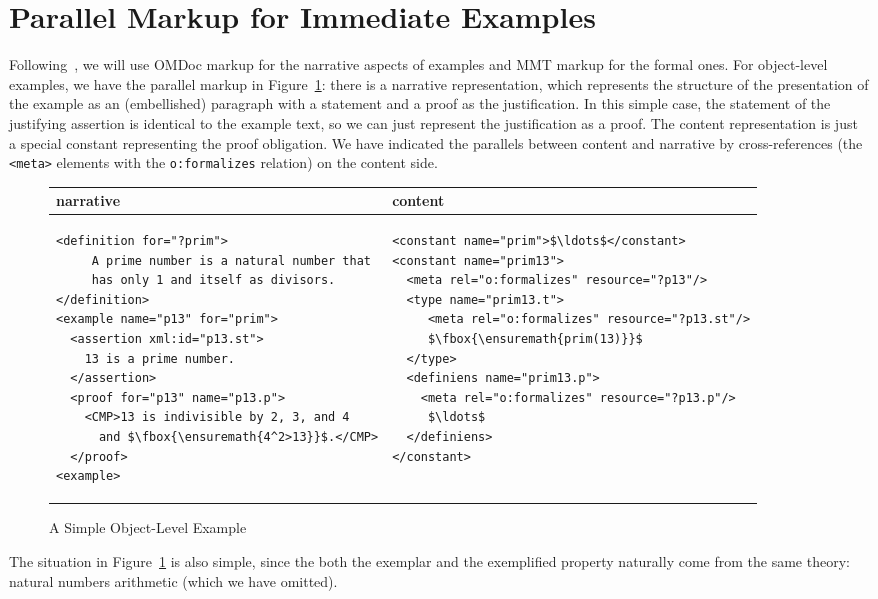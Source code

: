 \documentclass[11pt]{bluenote}
\def\mmt{MMT\xspace}
\def\omdoc{OMDoc\xspace}
\def\om#1{\fbox{\ensuremath{#1}}}
\def\omdoc{OMDoc\xspace}
\begin{document}
\section{Parallel Markup for Immediate Examples}\label{sec:immediate}

Following~\cite{KohIan:hlpmo13}, we will use \omdoc markup for the narrative aspects of
examples and \mmt markup for the formal ones. For object-level examples, we have the
parallel markup in Figure~\ref{fig:simple-object}: there is a narrative representation,
which represents the structure of the presentation of the example as an (embellished)
paragraph with a statement and a proof as the justification. In this simple case, the
statement of the justifying assertion is identical to the example text, so we can just
represent the justification as a proof. The content representation is just a special
constant representing the proof obligation. We have indicated the parallels between
content and narrative by cross-references (the \lstinline|<meta>| elements with the
\lstinline|o:formalizes| relation) on the content side.

\begin{figure}[ht]\centering
\lstset{mathescape}
\begin{tabular}{|p{7.1cm}|p{7.5cm}|}\hline
  narrative & content\\\hline
\begin{lstlisting}
<definition for="?prim">
     A prime number is a natural number that 
     has only 1 and itself as divisors.
</definition>
<example name="p13" for="prim">
  <assertion xml:id="p13.st">
    13 is a prime number.
  </assertion>
  <proof for="p13" name="p13.p">
    <CMP>13 is indivisible by 2, 3, and 4
      and $\om{4^2>13}$.</CMP>
  </proof>
<example>
\end{lstlisting}
&
\begin{lstlisting}
<constant name="prim">$\ldots$</constant>
<constant name="prim13">
  <meta rel="o:formalizes" resource="?p13"/>
  <type name="prim13.t">
     <meta rel="o:formalizes" resource="?p13.st"/>
     $\om{prim(13)}$
  </type>
  <definiens name="prim13.p">
    <meta rel="o:formalizes" resource="?p13.p"/>
     $\ldots$
  </definiens>
</constant>
\end{lstlisting}\\\hline
\end{tabular}
\caption{A Simple Object-Level Example}\label{fig:simple-object}
\end{figure}

The situation in Figure~\ref{fig:simple-object} is also simple, since the both the
exemplar and the exemplified property naturally come from the same theory: natural numbers
arithmetic (which we have omitted).
\end{document}
